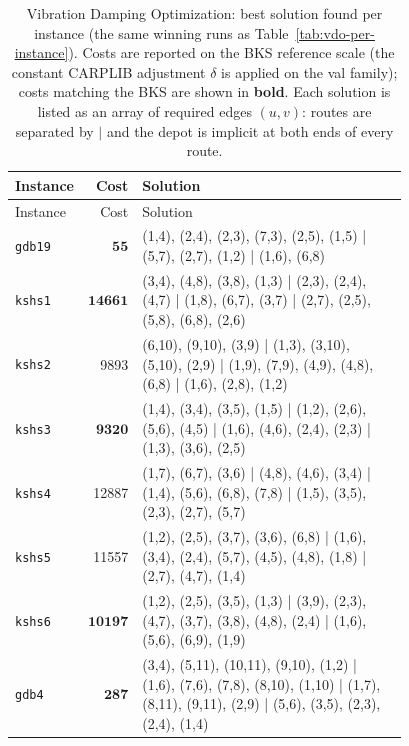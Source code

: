 \begin{landscape}
\begingroup\scriptsize
\begin{longtable}{lr>{\tiny\raggedright\arraybackslash}p{0.78\linewidth}}
\caption{Vibration Damping Optimization: best solution found per instance (the same winning runs as Table~\ref{tab:vdo-per-instance}). Costs are reported on the BKS reference scale (the constant CARPLIB adjustment $\delta$ is applied on the val family); costs matching the BKS are shown in \textbf{bold}. Each solution is listed as an array of required edges $(u,v)$: routes are separated by $|$ and the depot is implicit at both ends of every route.}\label{tab:vdo-solutions}\\
\toprule
Instance & Cost & Solution \\
\midrule
\endfirsthead
\toprule
Instance & Cost & Solution \\
\midrule
\endhead
\bottomrule
\endfoot
\texttt{gdb19} & $\mathbf{55}$ & (1,4), (2,4), (2,3), (7,3), (2,5), (1,5) | (5,7), (2,7), (1,2) | (1,6), (6,8) \\[2pt]
\texttt{kshs1} & $\mathbf{14661}$ & (3,4), (4,8), (3,8), (1,3) | (2,3), (2,4), (4,7) | (1,8), (6,7), (3,7) | (2,7), (2,5), (5,8), (6,8), (2,6) \\[2pt]
\texttt{kshs2} & 9893 & (6,10), (9,10), (3,9) | (1,3), (3,10), (5,10), (2,9) | (1,9), (7,9), (4,9), (4,8), (6,8) | (1,6), (2,8), (1,2) \\[2pt]
\texttt{kshs3} & $\mathbf{9320}$ & (1,4), (3,4), (3,5), (1,5) | (1,2), (2,6), (5,6), (4,5) | (1,6), (4,6), (2,4), (2,3) | (1,3), (3,6), (2,5) \\[2pt]
\texttt{kshs4} & 12887 & (1,7), (6,7), (3,6) | (4,8), (4,6), (3,4) | (1,4), (5,6), (6,8), (7,8) | (1,5), (3,5), (2,3), (2,7), (5,7) \\[2pt]
\texttt{kshs5} & 11557 & (1,2), (2,5), (3,7), (3,6), (6,8) | (1,6), (3,4), (2,4), (5,7), (4,5), (4,8), (1,8) | (2,7), (4,7), (1,4) \\[2pt]
\texttt{kshs6} & $\mathbf{10197}$ & (1,2), (2,5), (3,5), (1,3) | (3,9), (2,3), (4,7), (3,7), (3,8), (4,8), (2,4) | (1,6), (5,6), (6,9), (1,9) \\[2pt]
\texttt{gdb4} & $\mathbf{287}$ & (3,4), (5,11), (10,11), (9,10), (1,2) | (1,6), (7,6), (7,8), (8,10), (1,10) | (1,7), (8,11), (9,11), (2,9) | (5,6), (3,5), (2,3), (2,4), (1,4) \\[2pt]

\end{longtable}
\end{landscape}
